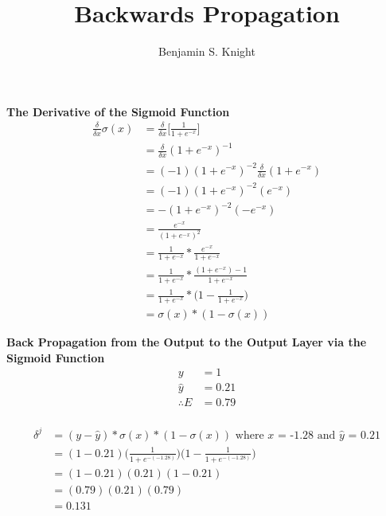 \documentclass[]{article}
\title{Backwards Propagation}
\author{Benjamin S. Knight}
\begin{document}
\maketitle

\noindent\textbf{The Derivative of the Sigmoid Function}\\
\begin{equation} \label{eq1}
\begin{split}
\displaystyle\frac{\delta}{\delta x}\sigma(x) & = \displaystyle\frac{\delta}{\delta x}\Big[\displaystyle\frac{1}{1 + e^{-x}}\Big] \\
& = \displaystyle\frac{\delta}{\delta x}(1 + e^{-x})^{-1} \\
& = (-1)(1 + e^{-x})^{-2}\displaystyle\frac{\delta}{\delta x}(1 + e^{-x}) \\
& = (-1)(1 + e^{-x})^{-2}(e^{-x}) \\
& = -(1 + e^{-x})^{-2}(-e^{-x})\\
& = \displaystyle\frac{e^{-x}}{(1 + e^{-x})^2} \\
& = \displaystyle\frac{1}{1 + e^{-x}}*\displaystyle\frac{e^{-x}}{1 + e^{-x}}\\
& = \displaystyle\frac{1}{1 + e^{-x}}*\displaystyle\frac{(1 + e^{-x}) - 1}{1 + e^{-x}}\\
& = \displaystyle\frac{1}{1 + e^{-x}}*\Big(1 - \displaystyle\frac{1}{1 + e^{-x}}\Big)\\
& = \sigma(x)*(1 - \sigma(x))
\end{split}
\end{equation}

\noindent\textbf{Back Propagation from the Output to the Output Layer via the Sigmoid Function}\\

\begin{equation} 
\begin{split}
y & = 1  \\
\hat{y} & = 0.21 \\
\therefore E & = 0.79 \\
\end{split}
\end{equation}

\begin{equation} 
\begin{split}
\delta^j & = (y - \hat{y})*\sigma(x)*(1 - \sigma(x)) \text{ where $x$ = -1.28 and $\hat{y}$ = 0.21}\\
& = (1 - 0.21)\Big(\displaystyle\frac{1}{1 + e^{-(-1.28)}}\Big)\Big(1 - \displaystyle\frac{1}{1 + e^{-(-1.28)}}\Big)\\
& = (1 - 0.21)(0.21)(1 - 0.21)\\
& = (0.79)(0.21)(0.79)\\
& = 0.131
\end{split}
\end{equation}
\end{document}
